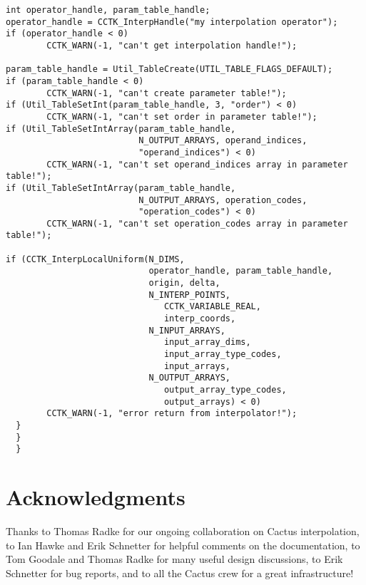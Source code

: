 \begin{verbatim}
int operator_handle, param_table_handle;
operator_handle = CCTK_InterpHandle("my interpolation operator");
if (operator_handle < 0)
        CCTK_WARN(-1, "can't get interpolation handle!");

param_table_handle = Util_TableCreate(UTIL_TABLE_FLAGS_DEFAULT);
if (param_table_handle < 0)
        CCTK_WARN(-1, "can't create parameter table!");
if (Util_TableSetInt(param_table_handle, 3, "order") < 0)
        CCTK_WARN(-1, "can't set order in parameter table!");
if (Util_TableSetIntArray(param_table_handle,
                          N_OUTPUT_ARRAYS, operand_indices,
                          "operand_indices") < 0)
        CCTK_WARN(-1, "can't set operand_indices array in parameter table!");
if (Util_TableSetIntArray(param_table_handle,
                          N_OUTPUT_ARRAYS, operation_codes,
                          "operation_codes") < 0)
        CCTK_WARN(-1, "can't set operation_codes array in parameter table!");

if (CCTK_InterpLocalUniform(N_DIMS,
                            operator_handle, param_table_handle,
                            origin, delta,
                            N_INTERP_POINTS,
                               CCTK_VARIABLE_REAL,
                               interp_coords,
                            N_INPUT_ARRAYS,
                               input_array_dims,
                               input_array_type_codes,
                               input_arrays,
                            N_OUTPUT_ARRAYS,
                               output_array_type_codes,
                               output_arrays) < 0)
        CCTK_WARN(-1, "error return from interpolator!");
  }
  }
  }
\end{verbatim}


\section{Acknowledgments}

Thanks to Thomas Radke for our ongoing collaboration on Cactus
interpolation,
to Ian Hawke and Erik Schnetter for helpful comments on the documentation,
to Tom Goodale and Thomas Radke for many useful design discussions,
to Erik Schnetter for bug reports,
and to all the Cactus crew for a great infrastructure!


